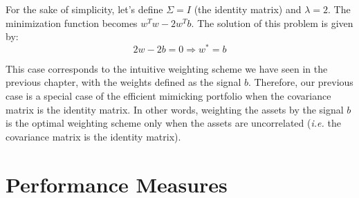 For the sake of simplicity, let's define $\Sigma = I$ (the identity matrix)
and $\lambda = 2$.
The minimization function becomes $w^T w - 2 w^T b$. The solution of this problem is given by:
\begin{equation}
    2w - 2b = 0 \Rightarrow w^* = b
\end{equation}

This case corresponds to the intuitive weighting scheme 
we have seen in the previous chapter, with the weights defined 
as the signal $b$. Therefore, our previous case 
is a special case of the efficient mimicking portfolio 
when the covariance matrix is the identity matrix. 
In other words, weighting the assets by the signal $b$
is the optimal weighting scheme only when the assets are
uncorrelated (\textit{i.e.} the covariance matrix is the identity matrix).



\section{Performance Measures}
